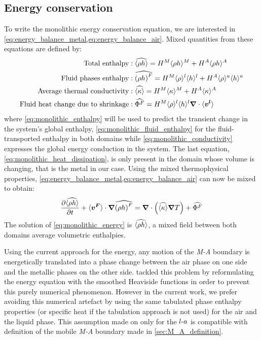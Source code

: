 \subsection{Energy conservation}
To write the monolithic energy conservation equation, we are interested in \cref{eq:energy_balance_metal,eq:energy_balance_air}.
Mixed quantities from these equations are defined by:
\begin{align}
%
\label{eq:monolithic_enthalpy}
\text{Total enthalpy}&: \mix{\avg{\rho h}} =  \heavisideM \avg{\rho h}^M + \heavisideA \avg{\rho h}^A  \\
%
\label{eq:monolithic_fluid_enthalpy}
\text{Fluid phases enthalpy}&: \mix{\brac{\rho h}^F} = \heavisideM \rhol \hl + \heavisideA \rhoa \ha \\
%
\label{eq:monolithic_conductivity}
\text{Average thermal conductivity}&: \mix{\avg{\kappa}} = \heavisideM \avg{\kappa}^M + \heavisideA \avg{\kappa}^A \\
%
\label{eq:monolithic_heat_dissipation}
\text{Fluid heat change due to shrinkage}&: \mix{\Phi^F} = \heavisideM \rhol \hl \nabvec \cdot \vit
\end{align}
where \cref{eq:monolithic_enthalpy} will be used to predict the transient change in the system's global enthalpy, 
\cref{eq:monolithic_fluid_enthalpy} for the fluid-transported enthalpy in both domains while \cref{eq:monolithic_conductivity}
expresses the global energy conduction in the system. The last equation, \cref{eq:monolithic_heat_dissipation}, is only present in the 
domain whose volume is changing, that is the metal in our case.
Using the mixed thermophysical properties, \cref{eq:energy_balance_metal,eq:energy_balance_air} can now be mixed to obtain:
\begin{align}
\label{eq:monolithic_energy}
\frac{\partial \widehat{\langle \rho h \rangle}}{\partial t} 
		+ \langle \boldsymbol{v^F} \rangle \cdot \boldsymbol{\nabla} \widehat{\left( \rho h \right)^F}
		= \boldsymbol{\nabla}  \cdot \left( \widehat{\langle \kappa \rangle} \boldsymbol{\nabla} T  \right)
		+ \widehat{\Phi^F} 
\end{align}
The solution of \cref{eq:monolithic_energy} is $\widehat{\langle \rho h \rangle}$, 
a mixed field between both domains average volumetric enthalpies. 

Using the current approach for the energy, any motion of the \emph{M-A} boundary is energetically translated
into a phase change between the air phase on one side and the metallic phases on the other side.
\citet{chen_three_2014} tackled this problem by reformulating the energy equation with the smoothed Heaviside functions in order to prevent 
this purely numerical phenomenon. However in the current work, we prefer avoiding this numerical artefact by 
using the same tabulated phase enthalpy properties (or specific heat if the tabulation approach is not used) for
the air and the liquid phase. This assumption made on only for the $l\text{-}a$ is compatible with definition of the mobile \emph{M-A}
boundary made in \cref{sec:M_A_definition}.

